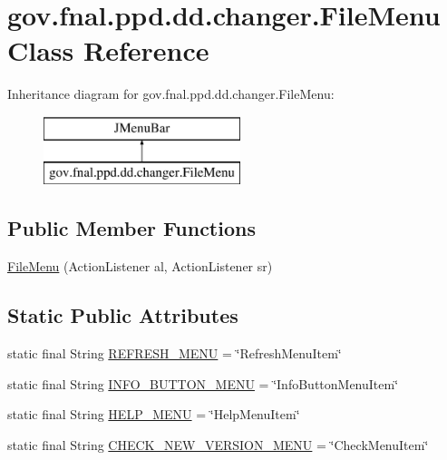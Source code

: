 \hypertarget{classgov_1_1fnal_1_1ppd_1_1dd_1_1changer_1_1FileMenu}{\section{gov.\-fnal.\-ppd.\-dd.\-changer.\-File\-Menu Class Reference}
\label{classgov_1_1fnal_1_1ppd_1_1dd_1_1changer_1_1FileMenu}
}
Inheritance diagram for gov.\-fnal.\-ppd.\-dd.\-changer.\-File\-Menu\-:\begin{figure}[H]
\begin{center}
\leavevmode
\includegraphics[height=2.000000cm]{classgov_1_1fnal_1_1ppd_1_1dd_1_1changer_1_1FileMenu}
\end{center}
\end{figure}
\subsection*{Public Member Functions}
\begin{DoxyCompactItemize}
\item 
\hyperlink{classgov_1_1fnal_1_1ppd_1_1dd_1_1changer_1_1FileMenu_af431678dddfefb6a2b928a97deeee6b2}{File\-Menu} (Action\-Listener al, Action\-Listener sr)
\end{DoxyCompactItemize}
\subsection*{Static Public Attributes}
\begin{DoxyCompactItemize}
\item 
static final String \hyperlink{classgov_1_1fnal_1_1ppd_1_1dd_1_1changer_1_1FileMenu_ae6c6477bb6dcf6f725fba6d32aefc3ee}{R\-E\-F\-R\-E\-S\-H\-\_\-\-M\-E\-N\-U} = \char`\"{}Refresh\-Menu\-Item\char`\"{}
\item 
static final String \hyperlink{classgov_1_1fnal_1_1ppd_1_1dd_1_1changer_1_1FileMenu_abce65935f1c446474f9a3c9c332a8210}{I\-N\-F\-O\-\_\-\-B\-U\-T\-T\-O\-N\-\_\-\-M\-E\-N\-U} = \char`\"{}Info\-Button\-Menu\-Item\char`\"{}
\item 
static final String \hyperlink{classgov_1_1fnal_1_1ppd_1_1dd_1_1changer_1_1FileMenu_a5c034e4370302b5ca64ca090934a2331}{H\-E\-L\-P\-\_\-\-M\-E\-N\-U} = \char`\"{}Help\-Menu\-Item\char`\"{}
\item 
static final String \hyperlink{classgov_1_1fnal_1_1ppd_1_1dd_1_1changer_1_1FileMenu_a06f9ec85c25e8ca8d123549044d827d7}{C\-H\-E\-C\-K\-\_\-\-N\-E\-W\-\_\-\-V\-E\-R\-S\-I\-O\-N\-\_\-\-M\-E\-N\-U} = \char`\"{}Check\-Menu\-Item\char`\"{}
\end{DoxyCompactItemize}


